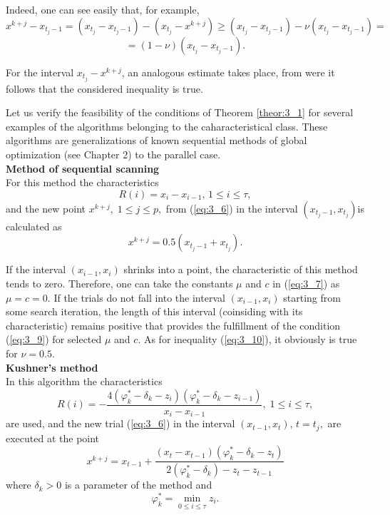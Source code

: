 	Indeed, one can see easily that, for example,
	\begin{displaymath}
	x^{k+j} -x_{t_{j} -1} =(x_{t_{j} } -x_{t_{j} -1} )-(x_{t_{j} } -x^{k+j} )\ge (x_{t_{j} } -x_{t_{j} -1} )-\nu (x_{t_{j} } -x_{t_{j} -1} )=  
	\end{displaymath}
	\begin{displaymath}
	=(1-\nu )(x_{t_{j} } -x_{t_{j} -1} ).  
	\end{displaymath}
	
	For the interval $x_{t_{j} } -x^{k+j} $, an analogous estimate takes place, from were it follows that the considered inequality is true. 
	
	Let us verify the feasibility of the conditions of Theorem  \ref{theor:3_1} for several examples of the algorithms belonging to the caharacteristical class. These algorithms are generalizations of known sequential methods of global optimization (see Chapter 2) to the parallel case. \\
	
	\textbf{Method of sequential scanning } \\
	
	For this method the characteristics 
	\[R(i)=x_{i} -x_{i-1} ,\, 1\le i\le \tau ,\] 
	and the new point  $x^{k+j} ,\; 1\le j\le p,$ from  (\ref{eq:3_6}) in the interval $(x_{t_{j} -1} ,x_{t_{j} } )$is calculated as
	\[x^{k+j} =0.5(x_{t_{j} -1} +x_{t_{j} } ).\] 
	
	If the interval $(x_{i-1} ,x_{i} )$ shrinks into a point, the characteristic of this method tends to zero. Therefore, one can take the constants $\mu$ and $c$ in  (\ref{eq:3_7}) as $\mu = c = 0 $. If the trials do not fall into the interval $(x_{i-1} ,x_{i} )$ starting from some search iteration, the length of this interval (coinsiding with its characteristic) remains positive that provides the fulfillment of the condition  (\ref{eq:3_9}) for selected $\mu$ and $c$. As for inequality  (\ref{eq:3_10}), it obviously is true for  $\nu = 0.5$.
	\\ 
	
	\textbf{Kushner's method }\cite{3_Kushner} \\
	
	In this algorithm the characteristics 
	\[R(i)=-\frac{4(\varphi _{k}^{*} -\delta _{k} -z_{i} )(\varphi _{k}^{*} -\delta _{k} -z_{i-1} )}{x_{i} -x_{i-1} } ,\; 1\le i\le \tau ,\] 
	are used, and the new trial  (\ref{eq:3_6}) in the interval  $(x_{t-1} ,x_{t} ),\, t=t_{j} ,$  are executed at the point
	\begin{equation} 
	\label{eq:3_15} 
	x^{k+j} =x_{t-1} +\frac{(x_{t} -x_{t-1} )(\varphi _{k}^{*} -\delta _{k} -z_{t} )}{2(\varphi _{k}^{*} -\delta _{k} )-z_{t} -z_{t-1} }  
	\end{equation} 
	where $\delta _{k} >0$ is a parameter of the method and 
	\[\varphi _{k}^{*} =\mathop{\min }\limits_{0\le i\le \tau } z_{i} .\] 
	

